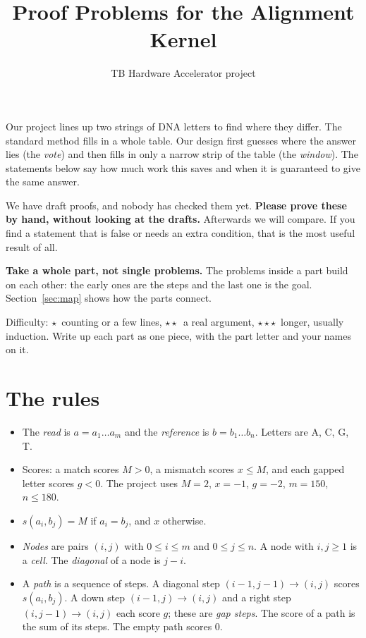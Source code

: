 \documentclass[11pt]{article}
\title{Proof Problems for the Alignment Kernel}
\author{TB Hardware Accelerator project}
\date{}
\newcounter{prob}
\newcommand{\easy}{$\star$}
\newcommand{\medium}{$\star\star$}
\newcommand{\hard}{$\star\star\star$}
\begin{document}
\maketitle

\noindent
Our project lines up two strings of DNA letters to find where they differ. The
standard method fills in a whole table. Our design first guesses where the
answer lies (the \emph{vote}) and then fills in only a narrow strip of the table
(the \emph{window}). The statements below say how much work this saves and when
it is guaranteed to give the same answer.

We have draft proofs, and nobody has checked them yet. \textbf{Please prove
these by hand, without looking at the drafts.} Afterwards we will compare. If
you find a statement that is false or needs an extra condition, that is the
most useful result of all.

\textbf{Take a whole part, not single problems.} The problems inside a part
build on each other: the early ones are the steps and the last one is the goal.
Section~\ref{sec:map} shows how the parts connect.

Difficulty: \easy\ counting or a few lines, \medium\ a real argument, \hard\
longer, usually induction. Write up each part as one piece, with the part
letter and your names on it.

\section{The rules}

\begin{itemize}[nosep]
\item The \emph{read} is $a = a_1 \dots a_m$ and the \emph{reference} is
      $b = b_1 \dots b_n$. Letters are A, C, G, T.
\item Scores: a match scores $M > 0$, a mismatch scores $x \le M$, and each
      gapped letter scores $g < 0$. The project uses $M = 2$, $x = -1$,
      $g = -2$, $m = 150$, $n \le 180$.
\item $s(a_i,b_j) = M$ if $a_i = b_j$, and $x$ otherwise.
\item \emph{Nodes} are pairs $(i,j)$ with $0 \le i \le m$ and $0 \le j \le n$.
      A node with $i,j \ge 1$ is a \emph{cell}. The \emph{diagonal} of a node
      is $j - i$.
\item A \emph{path} is a sequence of steps. A diagonal step
      $(i-1,j-1)\to(i,j)$ scores $s(a_i,b_j)$. A down step $(i-1,j)\to(i,j)$
      and a right step $(i,j-1)\to(i,j)$ each score $g$; these are \emph{gap
      steps}. The score of a path is the sum of its steps. The empty path
      scores $0$.
\end{itemize}
\end{document}

